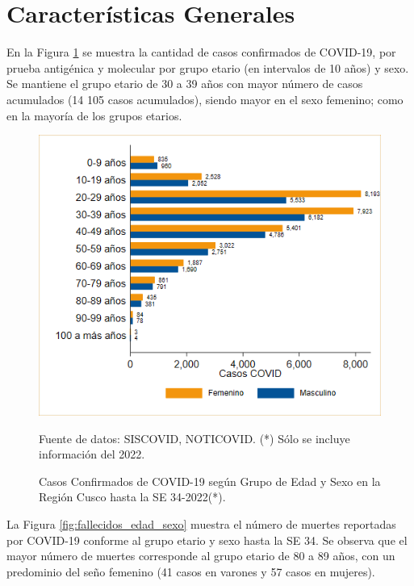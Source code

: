 \documentclass[12pt,a4paper,openany]{book}
\begin{document}
	
	\clearpage	
	\section*{Características Generales}
	
	
	
	\noindent En la Figura \ref{fig:casos_edad_sexo} se muestra la cantidad de casos confirmados de COVID-19, por prueba antigénica y molecular por grupo etario (en intervalos de 10 años) y sexo. Se mantiene el grupo etario de 30 a 39 años con mayor número de casos acumulados (14 105 casos acumulados), siendo mayor en el sexo femenino; como en la mayoría de los grupos etarios. 
	
	
	\begin{figure}[h]
		\caption{Casos Confirmados de COVID-19 según Grupo de Edad y Sexo en la Región Cusco hasta la SE 34-2022(*).}\label{fig:casos_edad_sexo}
		\begin{center}
			\includegraphics[width=0.75\linewidth]{../figuras/casos_etapavida_2022}
		\end{center}
		{\footnotesize {Fuente de datos: SISCOVID, NOTICOVID. (*) Sólo se incluye información del 2022.}}
	\end{figure}
	\pagebreak
	
	
	La Figura \ref{fig:fallecidos_edad_sexo}  muestra el número de muertes reportadas por COVID-19 conforme al grupo etario y sexo hasta la SE 34. Se observa que el mayor número de muertes corresponde al grupo etario de 80 a 89 años, con un predominio del seño femenino (41 casos en varones y 57 casos en mujeres).
	
\end{document}
